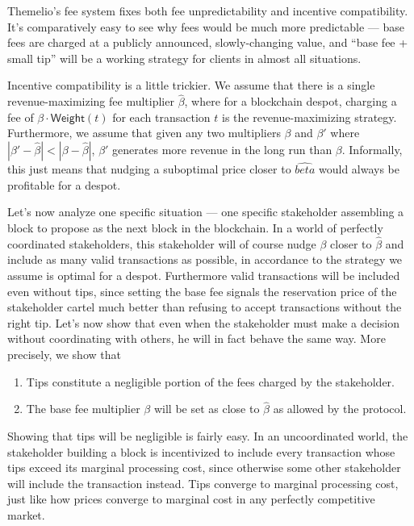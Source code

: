 \documentclass[letterpaper,12pt,oneside]{article}
\begin{document}
Themelio's fee system fixes both fee unpredictability and incentive compatibility. It's comparatively easy to see why fees would be much more predictable --- base fees are charged at a publicly announced, slowly-changing value, and ``base fee + small tip'' will be a working strategy for clients in almost all situations.

Incentive compatibility is a little trickier. We assume that there is a single revenue-maximizing fee multiplier $\hat{\beta}$, where for a blockchain despot, charging a fee of $\beta \cdot \mathsf{Weight}(t)$ for each transaction $t$ is the revenue-maximizing strategy. Furthermore, we assume that given any two multipliers $\beta$ and $\beta'$ where $| \beta' - \hat{\beta} | < | \beta - \hat{\beta} |$, $\beta'$ generates more revenue in the long run than $\beta$. Informally, this just means that nudging a suboptimal price closer to $\hat{beta}$ would always be profitable for a despot.

Let's now analyze one specific situation --- one specific stakeholder assembling a block to propose as the next block in the blockchain. In a world of perfectly coordinated stakeholders, this stakeholder will of course nudge $\beta$ closer to $\hat{\beta}$ and include as many valid transactions as possible, in accordance to the strategy we assume is optimal for a despot. Furthermore valid transactions will be included even without tips, since setting the base fee signals the reservation price of the stakeholder cartel much better than refusing to accept transactions without the right tip. Let's now show that even when the stakeholder must make a decision without coordinating with others, he will in fact behave the same way. More precisely, we show that

\begin{enumerate}
    \item Tips constitute a negligible portion of the fees charged by the stakeholder.
    \item The base fee multiplier $\beta$ will be set as close to $\hat{\beta}$ as allowed by the protocol.
\end{enumerate}

Showing that tips will be negligible is fairly easy. In an uncoordinated world, the stakeholder building a block is incentivized to include every transaction whose tips exceed its marginal processing cost, since otherwise some other stakeholder will include the transaction instead. Tips converge to marginal processing cost, just like how prices converge to marginal cost in any perfectly competitive market.
\end{document}
